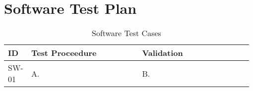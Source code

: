 

\setcounter{section}{4}
\section{Software Test Plan}
\bigskip


\bigskip
\bgroup
\def\arraystretch{1.25}
\begin{table}[h!]
    \centering
    \begin{tabular}{|m{0.075\linewidth}|m{0.45\linewidth}|m{0.45\linewidth}|} 
    \hline
    ID & Test Proceedure & Validation\\ 
    
    \hline
    SW-01
    & A.  
    & B. \\ 
    \hline    





    \hline
    \end{tabular}
    \caption{Software Test Cases}
\end{table}